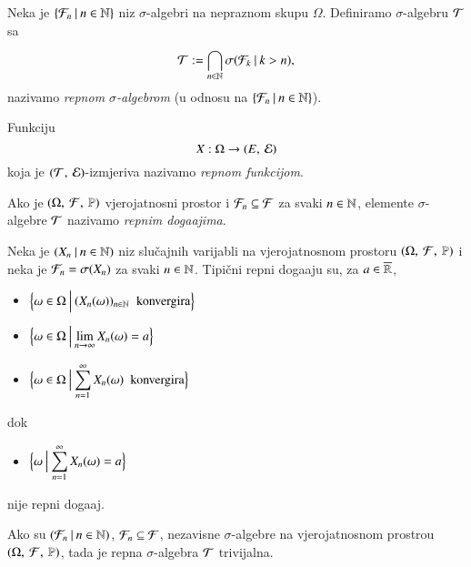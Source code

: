 \begin{defn}    \label{defn:9.7}
    Neka je $\{{\mathcal{F}_n} \: | \: {n \in \mathbb{N}}\}$ niz $\sigma$-algebri na nepraznom skupu $\Omega$.
    Definiramo $\sigma$-algebru $\mathcal{T}$ sa
    \begin{equation*}
        \mathcal{T} := \bigcap\limits_{n \in \mathbb{N}}^{} \sigma({\mathcal{F}_k} \: | \: {k > n}),
    \end{equation*}
    nazivamo \emph{repnom $\sigma$-algebrom} (u odnosu na $\{{\mathcal{F}_n} \: | \: {n \in \mathbb{N}}\}$).

    Funkciju
    \begin{equation*}
        X : \Omega \to ({E}, \: {\mathcal{E}})
    \end{equation*}
    koja je $({\mathcal{T}}, \: {\mathcal{E}})$-izmjeriva nazivamo \emph{repnom funkcijom}.

    Ako je $(\Omega, \: \mathcal{F}, \: \mathbb{P})$ vjerojatnosni prostor i $\mathcal{F}_n \subseteq \mathcal{F}$ za svaki $n \in \mathbb{N}$, elemente $\sigma$-algebre $\mathcal{T}$ nazivamo \emph{repnim doga\dj ajima}.
\end{defn}

\begin{pr}  \label{pr:9.8}
    Neka je $({X_n} \: | \: {n \in \mathbb{N}})$ niz slu\v cajnih varijabli na vjerojatnosnom prostoru $(\Omega, \: \mathcal{F}, \: \mathbb{P})$ i neka je $\mathcal{F}_n = \sigma({X_n})$ za svaki $n \in \mathbb{N}$.
    Tipi\v cni repni doga\dj aju su, za $a \in \overline{\mathbb{R}}$,
    \begin{itemize}
        \item[] $\displaystyle \Big\{ {\omega \in \Omega} \: \Big| \: {(X_n(\omega))_{n \in \mathbb{N}} \; \textnormal{ konvergira}} \Big\}$
        \item[] $\displaystyle \Big\{ {\omega \in \Omega} \: \Big| \: {\lim\limits_{n \to \infty} X_n(\omega) = a} \Big\}$
        \item[] $\displaystyle \Big\{ {\omega \in \Omega} \: \Big| \: {\sum\limits_{n = 1}^{\infty} X_n(\omega) \; \textnormal{ konvergira}} \Big\}$
    \end{itemize}
    dok
    \begin{itemize}
        \item[] $\displaystyle \Big\{ {\omega} \: \Big| \: {\sum\limits_{n = 1}^{\infty} X_n (\omega) = a} \Big\}$
    \end{itemize}
    nije repni doga\dj aj.
\end{pr}

\begin{tm}  \label{tm:9.9}
    Ako su $({\mathcal{F}_n} \: | \: {n \in \mathbb{N}})$, $\mathcal{F}_n \subseteq \mathcal{F}$, nezavisne $\sigma$-algebre na vjerojatnosnom prostrou $(\Omega, \: \mathcal{F}, \: \mathbb{P})$, tada je repna $\sigma$-algebra $\mathcal{T}$ trivijalna.
\end{tm}

